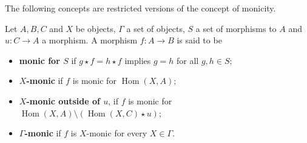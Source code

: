 The following concepts are restricted versions of the concept of monicity.
\begin{definition}
    \label{def:relative_monicity}
    Let $A,B,C$ and $X$ be objects, $\Gamma$ a set of objects, $S$ a set of morphisms to $A$ and $u:C \mathop{\to} A$ a morphism. A morphism $f : A \mathop{\to} B$ is said to be
    \begin{itemize} 
        \item 
            \textbf{monic for $S$}
            if $g \mathop{\star} f \mathop{=} h \mathop{\star} f$ implies $g \mathop{=} h$ for all $g, h \mathop{\in} S$;
        \item 
            \textbf{$X$-monic} if $f$ is monic for $\operatorname{Hom}(X, A)$;
        \item \textbf{$X$-monic outside of $u$}, if $f$ is monic for \( \operatorname{Hom}(X,A) \mathop{\setminus} \left ( \operatorname{Hom}(X,C) \mathop{\star} u \right ) \);
        \item  \textbf{$\Gamma$-monic} if $f$ is $X$-monic for every $X \mathop{\in} \Gamma$.
    \end{itemize}
\end{definition} 
